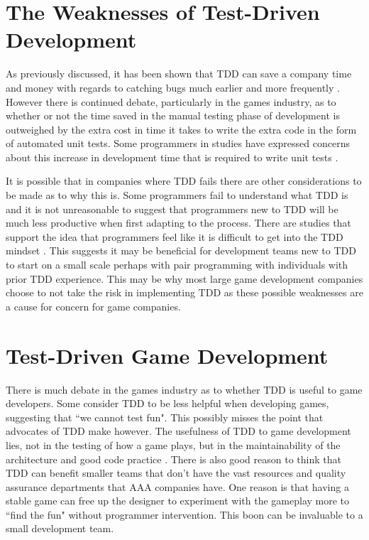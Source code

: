 \documentclass{scrartcl}
\begin{document}
\section*{The Weaknesses of Test-Driven Development}

As previously discussed, it has been shown that TDD can save a company time and money with regards to catching bugs much earlier and more frequently \cite{kayongo2016software} \cite{GDCBackwards}. However there is continued debate, particularly in the games industry, as to whether or not the time saved in the manual testing phase of development is outweighed by the extra cost in time it takes to write the extra code in the form of automated unit tests\cite{stackover}. Some programmers in studies have expressed concerns about this increase in development time that is required to write unit tests \cite{george2003initial}.  

It is possible that in companies where TDD fails there are other considerations to be made as to why this is. Some programmers fail to understand what TDD is \cite{janzen2008does} and it is not unreasonable to suggest that programmers new to TDD will be much less productive when first adapting to the process. There are studies that support the idea that programmers feel like it is difficult to get into the TDD mindset \cite{george2003initial}. This suggests it may be beneficial for development teams new to TDD to start on a small scale perhaps with pair programming with individuals with prior TDD experience. This may be why most large game development companies choose to not take the risk in implementing TDD as these possible weaknesses are a cause for concern for game companies.


\section*{Test-Driven Game Development}

There is much debate in the games industry as to whether TDD is useful to game developers. Some consider TDD to be less helpful when developing games, suggesting that \textquotedblleft we cannot test fun". This possibly misses the point that advocates of TDD make however. The usefulness of TDD to game development lies, not in the testing of how a game plays, but in the maintainability of the architecture and good code practice \cite{UncleBob}. There is also good reason to think that TDD can benefit smaller teams that don't have the vast resources and quality assurance departments that AAA companies have. One reason is that having a stable game can free up the designer to experiment with the gameplay more to \textquotedblleft find the fun" without programmer intervention\cite{GamaTDDExp}. This boon can be invaluable to a small development team.
\end{document}
